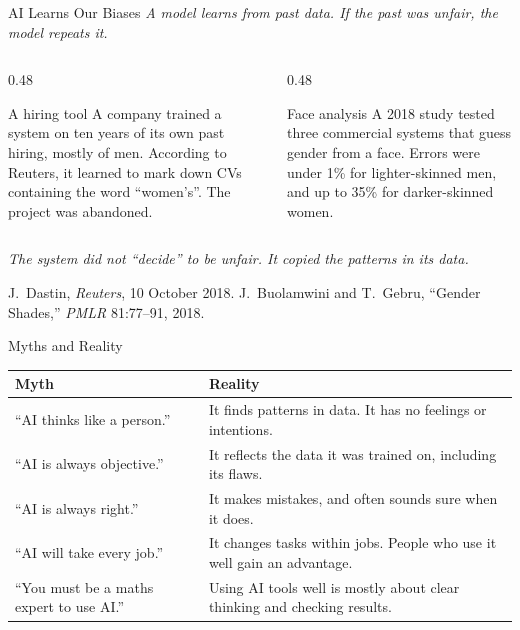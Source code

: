 \begin{frame}{AI Learns Our Biases}
    \textit{A model learns from past data. If the past was unfair, the model repeats it.}

    \vspace{0.6em}
    \begin{columns}[T]
        \begin{column}{0.48\textwidth}
            \begin{block}{A hiring tool}
                \small
                A company trained a system on ten years of its own past hiring, mostly of men.
                According to Reuters, it learned to mark down CVs containing the word ``women's''.
                The project was abandoned.
            \end{block}
        \end{column}
        \begin{column}{0.48\textwidth}
            \begin{block}{Face analysis}
                \small
                A 2018 study tested three commercial systems that guess gender from a face.
                Errors were under 1\% for lighter-skinned men, and up to 35\% for
                darker-skinned women.
            \end{block}
        \end{column}
    \end{columns}

    \vspace{0.6em}
    \centering
    \textit{The system did not ``decide'' to be unfair. It copied the patterns in its data.}

    \vspace{0.4em}
    {\scriptsize J.~Dastin, \emph{Reuters}, 10 October 2018. \quad
    J.~Buolamwini and T.~Gebru, ``Gender Shades,'' \emph{PMLR} 81:77--91, 2018.}
\end{frame}

\begin{frame}{Myths and Reality}
    \centering
    \renewcommand{\arraystretch}{1.6}
    \begin{tabular}{@{} >{\raggedright\arraybackslash}p{}
                        >{\raggedright\arraybackslash}p{} @{}}
        \toprule
        \textbf{Myth} & \textbf{Reality} \\
        \midrule
        ``AI thinks like a person.'' & It finds patterns in data. It has no feelings or intentions. \\
        ``AI is always objective.'' & It reflects the data it was trained on, including its flaws. \\
        ``AI is always right.'' & It makes mistakes, and often sounds sure when it does. \\
        ``AI will take every job.'' & It changes tasks within jobs. People who use it well gain an advantage. \\
        ``You must be a maths expert to use AI.'' & Using AI tools well is mostly about clear thinking and checking results. \\
        \bottomrule
    \end{tabular}
\end{frame}

